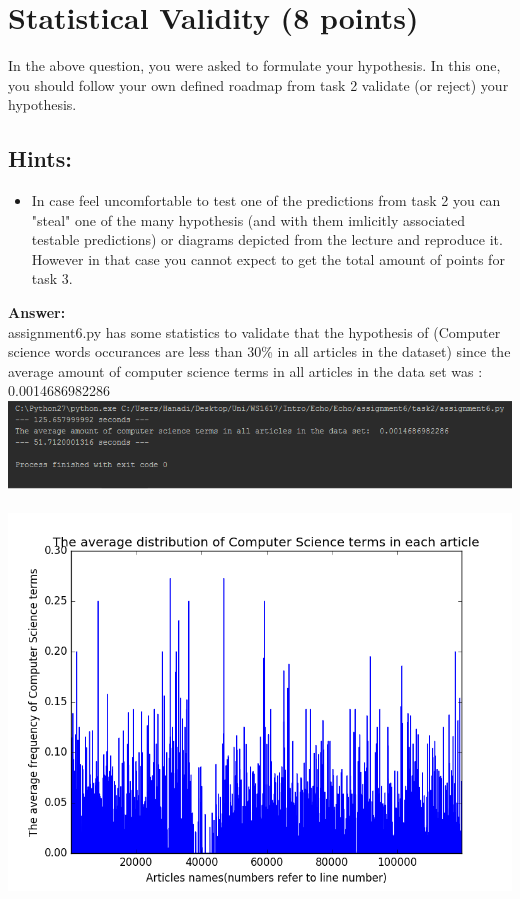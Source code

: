 \documentclass{WeSTassignment}
\begin{document}
\section{Statistical Validity (8 points)}
In the above question, you were asked to formulate your hypothesis. In this one, you should follow your own defined roadmap from task 2 validate (or reject) your hypothesis. 

\subsection{Hints:}
\begin{itemize}
\item In case feel uncomfortable to test one of the predictions from task 2 you can "steal" one of the many hypothesis (and with them imlicitly associated testable predictions) or diagrams depicted from the lecture and reproduce it. However in that case you cannot expect to get the total amount of points for task 3. 
\end{itemize}
\textbf{Answer:} \\
assignment6.py has some statistics to validate that the hypothesis of (Computer science words occurances are less than 30\% in all articles in the dataset) since the average amount of computer science terms in all articles in the data set was : 0.0014686982286 \\
\includegraphics[width=1\textwidth]{output.png} \\ \\
\includegraphics[width=1\textwidth]{figure_1.png} \\






\makefooter
\end{document}
